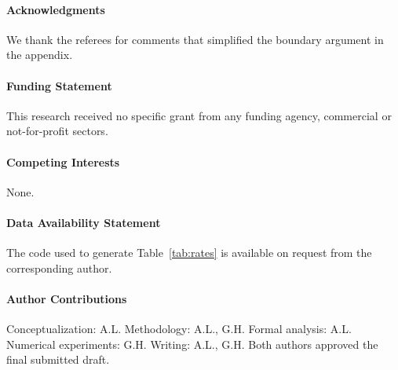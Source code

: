 \documentclass[journal=gmj]{CUP-JNL-DTM}
\theoremstyle{definition}
\begin{document}
\begin{Backmatter}

\paragraph{Acknowledgments}
We thank the referees for comments that simplified the boundary argument in
the appendix.

\paragraph{Funding Statement}
This research received no specific grant from any funding agency, commercial
or not-for-profit sectors.

\paragraph{Competing Interests}
None.

\paragraph{Data Availability Statement}
The code used to generate Table~\ref{tab:rates} is available on request from
the corresponding author.

\paragraph{Author Contributions}
Conceptualization: A.L. Methodology: A.L., G.H. Formal analysis: A.L.
Numerical experiments: G.H. Writing: A.L., G.H. Both authors approved the
final submitted draft.



\end{Backmatter}
\end{document}
